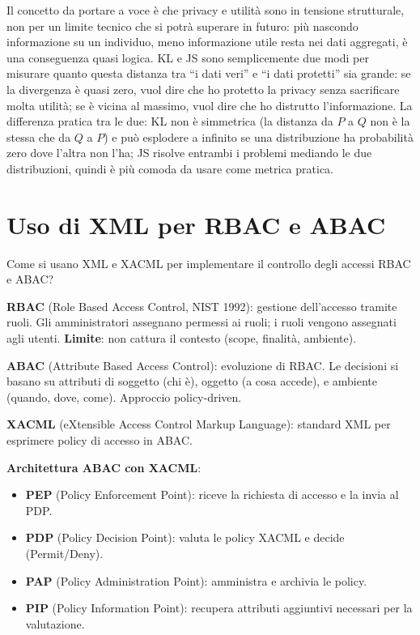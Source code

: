 \documentclass[a4paper,11pt]{article}
\begin{document}
\begin{nota}
Il concetto da portare a voce \`{e} che privacy e utilit\`{a} sono in tensione strutturale, non per un limite tecnico che si potr\`{a} superare in futuro: pi\`{u} nascondo informazione su un individuo, meno informazione utile resta nei dati aggregati, \`{e} una conseguenza quasi logica. KL e JS sono semplicemente due modi per misurare quanto questa distanza tra ``i dati veri'' e ``i dati protetti'' sia grande: se la divergenza \`{e} quasi zero, vuol dire che ho protetto la privacy senza sacrificare molta utilit\`{a}; se \`{e} vicina al massimo, vuol dire che ho distrutto l'informazione. La differenza pratica tra le due: KL non \`{e} simmetrica (la distanza da $P$ a $Q$ non \`{e} la stessa che da $Q$ a $P$) e pu\`{o} esplodere a infinito se una distribuzione ha probabilit\`{a} zero dove l'altra non l'ha; JS risolve entrambi i problemi mediando le due distribuzioni, quindi \`{e} pi\`{u} comoda da usare come metrica pratica.
\end{nota}

\section{Uso di XML per RBAC e ABAC}

\begin{domanda}
Come si usano XML e XACML per implementare il controllo degli accessi RBAC e ABAC?
\end{domanda}

\textbf{RBAC} (Role Based Access Control, NIST 1992): gestione dell'accesso tramite ruoli. Gli amministratori assegnano permessi ai ruoli; i ruoli vengono assegnati agli utenti. \textbf{Limite}: non cattura il contesto (scope, finalit\`{a}, ambiente).

\textbf{ABAC} (Attribute Based Access Control): evoluzione di RBAC. Le decisioni si basano su attributi di soggetto (chi \`{e}), oggetto (a cosa accede), e ambiente (quando, dove, come). Approccio policy-driven.

\textbf{XACML} (eXtensible Access Control Markup Language): standard XML per esprimere policy di accesso in ABAC.

\textbf{Architettura ABAC con XACML}:
\begin{itemize}
  \item \textbf{PEP} (Policy Enforcement Point): riceve la richiesta di accesso e la invia al PDP.
  \item \textbf{PDP} (Policy Decision Point): valuta le policy XACML e decide (Permit/Deny).
  \item \textbf{PAP} (Policy Administration Point): amministra e archivia le policy.
  \item \textbf{PIP} (Policy Information Point): recupera attributi aggiuntivi necessari per la valutazione.
\end{itemize}
\end{document}
